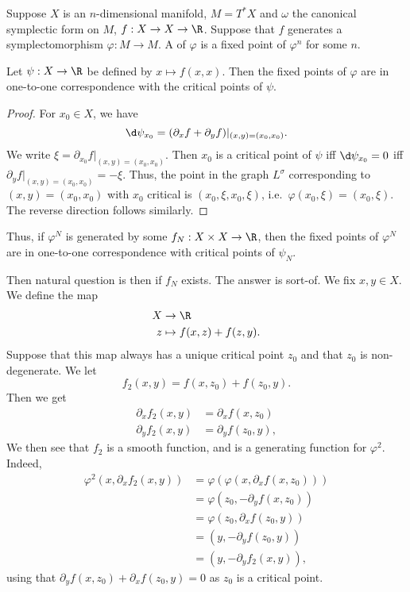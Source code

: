 \documentclass[a4paper]{article}
\begin{document}
Suppose $X$ is an $n$-dimensional manifold, $M = T^*X$ and $\omega$ the canonical symplectic form on $M$, $f: X \to X \to \R$. Suppose that $f$ generates a symplectomorphism $\varphi: M \to M$. A  of $\varphi$ is a fixed point of $\varphi^n$ for some $n$.

\begin{prop}
  Let $\psi: X \to \R$ be defined by $x \mapsto f(x, x)$. Then the fixed points of $\varphi$ are in one-to-one correspondence with the critical points of $\psi$.
\end{prop}

\begin{proof}
  For $x_0 \in X$, we have
  \[
    \d \psi_{x_0} = (\partial_x f + \partial_y f)|_{(x, y) = (x_0, x_0)}.
  \]
  We write $\xi = \partial_{x_0} f|_{(x, y) = (x_0, x_0)}$. Then $x_0$ is a critical point of $\psi$ iff $\d \psi_{x_0} = 0$ iff $\partial_y f|_{(x, y) = (x_0, x_0)} = - \xi$. Thus, the point in the graph $L^\sigma$ corresponding to $(x, y) = (x_0, x_0)$ with $x_0$ critical is $(x_0, \xi, x_0, \xi)$, i.e.\ $\varphi(x_0, \xi) = (x_0, \xi)$. The reverse direction follows similarly. %
\end{proof}

Thus, if $\varphi^N$ is generated by some $f_N: X \times X \to \R$, then the fixed points of $\varphi^N$ are in one-to-one correspondence with critical points of $\psi_N$.

Then natural question is then if $f_N$ exists. The answer is sort-of. We fix $x, y \in X$. We define the map
\begin{align*}
  X &\to \R\\
  z &\mapsto f(x, z) + f(z, y).
\end{align*}
Suppose that this map always has a unique critical point $z_0$ and that $z_0$ is non-degenerate. We let
\[
  f_2(x, y) = f(x, z_0) + f(z_0, y).
\]
Then we get
\begin{align*}
  \partial_x f_2(x, y) &= \partial_x f(x, z_0)\\
  \partial_y f_2(x, y) &= \partial_y f(z_0, y),
\end{align*}
We then see that $f_2$ is a smooth function, and is a generating function for $\varphi^2$. Indeed,
\begin{align*}
  \varphi^2(x, \partial_x f_2(x, y)) &= \varphi(\varphi(x, \partial_x f(x, z_0)))\\
  &= \varphi(z_0, -\partial_y f(x, z_0))\\
  &= \varphi(z_0, \partial_x f(z_0, y))\\
  &= (y, -\partial_y f(z_0, y))\\
  &= (y, -\partial_y f_2(x, y)),
\end{align*}
using that $\partial_y f(x, z_0) + \partial_x f(z_0, y) = 0$ as $z_0$ is a critical point.
\end{document}
